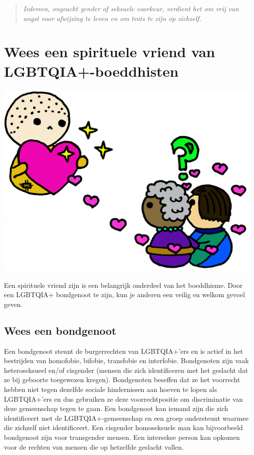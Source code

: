 \documentclass[12pt,openany]{book}
\begin{document}
\begin{quote}
\textit{Iedereen, ongeacht gender of seksuele voorkeur, verdient het om vrij van angst voor afwijzing te leven en om trots te zijn op zichzelf.}
\end{quote}

\chapter*{Wees een spirituele vriend van LGBTQIA+-boeddhisten}

\includegraphics[width=\textwidth]{10.png}


Een spirituele vriend zijn is een belangrijk onderdeel van het boeddhisme. Door een LGBTQIA+ bondgenoot te zijn, kun je anderen een veilig en welkom gevoel geven.

\section*{Wees een bondgenoot}

Een  bondgenoot steunt de burgerrechten van LGBTQIA+’ers en is actief in het bestrijden van homofobie, bifobie, transfobie en interfobie. Bondgenoten zijn vaak heteroseksueel en/of cisgender (mensen die zich identificeren met het geslacht dat ze bij geboorte toegewezen kregen). Bondgenoten beseffen dat ze het voorrecht hebben niet tegen dezelfde sociale hindernissen aan hoeven te lopen als LGBTQIA+’ers en dus gebruiken ze deze voorrechtpositie om discriminatie van deze gemeenschap tegen te gaan. 
Een bondgenoot kan iemand zijn die zich identificeert met de LGBTQIA+-gemeenschap en een groep ondersteunt waarmee die zichzelf niet identificeert. Een cisgender homoseksuele man kan bijvoorbeeld bondgenoot zijn voor transgender mensen. Een intersekse person kan opkomen voor de rechten van mensen die op hetzelfde geslacht vallen.
\end{document}
